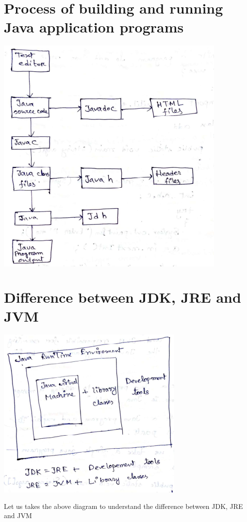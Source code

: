 \documentclass[11pt, a4paper]{book}
\begin{document}
    \section{Process of building and running Java application programs}
      \includegraphics{pobarjap}
    
    \section{Difference between JDK, JRE and JVM}
      \includegraphics{diffjdkjrejvm}
  
      Let us takes the above diagram to understand the difference between JDK, JRE and JVM
  
\end{document}
